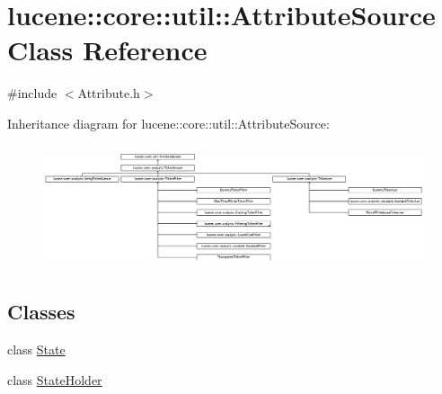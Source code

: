 \hypertarget{classlucene_1_1core_1_1util_1_1AttributeSource}{}\section{lucene\+:\+:core\+:\+:util\+:\+:Attribute\+Source Class Reference}
\label{classlucene_1_1core_1_1util_1_1AttributeSource}


{\ttfamily \#include $<$Attribute.\+h$>$}

Inheritance diagram for lucene\+:\+:core\+:\+:util\+:\+:Attribute\+Source\+:\begin{figure}[H]
\begin{center}
\leavevmode
\includegraphics[height=3.624595cm]{classlucene_1_1core_1_1util_1_1AttributeSource}
\end{center}
\end{figure}
\subsection*{Classes}
\begin{DoxyCompactItemize}
\item 
class \mbox{\hyperlink{classlucene_1_1core_1_1util_1_1AttributeSource_1_1State}{State}}
\item 
class \mbox{\hyperlink{classlucene_1_1core_1_1util_1_1AttributeSource_1_1StateHolder}{State\+Holder}}
\end{DoxyCompactItemize}
